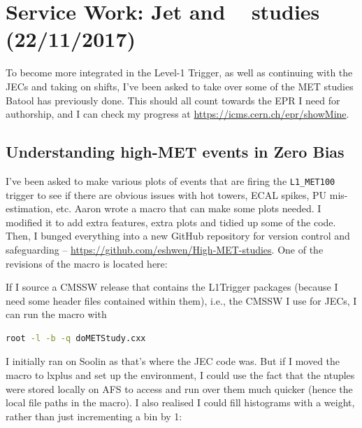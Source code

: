 \newpage
\chapter{Service Work: Jet and \texorpdfstring{\etmiss\ }{ETmiss} studies (22/11/2017)}

To become more integrated in the Level-1 Trigger, as well as continuing with the JECs and taking on shifts, I've been asked to take over some of the MET studies Batool has previously done. This should all count towards the EPR I need for authorship, and I can check my progress at \url{https://icms.cern.ch/epr/showMine}.

\section{Understanding high-MET events in Zero Bias}

I've been asked to make various plots of events that are firing the \texttt{L1\_MET100} trigger to see if there are obvious issues with hot towers, ECAL spikes, PU mis-estimation, etc. Aaron wrote a macro that can make some plots needed. I modified it to add extra features, extra plots and tidied up some of the code. Then, I bunged everything into a new GitHub repository for version control and safeguarding -- \url{https://github.com/eshwen/High-MET-studies}. One of the revisions of the macro is located here: %

If I source a CMSSW release that contains the L1Trigger packages (because I need some header files contained within them), i.e., the CMSSW I use for JECs, I can run the macro with

\begin{lstlisting}[belowskip=-0.7cm, language=sh, numbers=none]
root -l -b -q doMETStudy.cxx
\end{lstlisting}

I initially ran on Soolin as that's where the JEC code was. But if I moved the macro to lxplus and set up the environment, I could use the fact that the ntuples were stored locally on AFS to access and run over them much quicker (hence the local file paths in the macro). I also realised I could fill histograms with a weight, rather than just incrementing a bin by 1:


